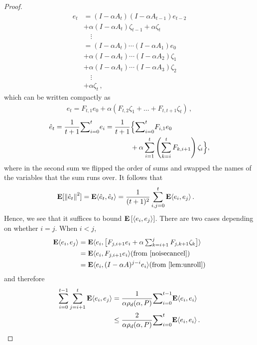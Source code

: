 \begin{proof}

\begin{align*}
e_t
& = (I-\alpha A_t) (I-\alpha A_{t-1}) e_{t-2}\\ &+ \alpha (I-\alpha A_t) \zeta_{t-1} +\alpha \zeta_t \\
& \quad \vdots\\
& = (I-\alpha A_t) \cdots (I-\alpha A_1) e_0\\ &+ \alpha (I-\alpha A_t) \cdots (I-\alpha A_2) \zeta_1 \\
& + \alpha (I-\alpha A_t) \cdots (I-\alpha A_3) \zeta_2\\
&  \quad \vdots \\
&+ \alpha \zeta_t\,,
\end{align*}
which can be written compactly as
\begin{align}
\label{eq:etft}
e_t = F_{t,1} e_0 + \alpha (F_{t,2} \zeta_1 + \dots + F_{t,t+1} \zeta_t )\,,
\end{align}
\begin{align*}
\hat{e}_t=\frac{1}{t+1}{\sum}_{i=0}^{t}e_i
=\frac{1}{t+1}&\Big\{{\sum}_{i=0}^{t} F_{i,1} e_0 \\
&+ \alpha \sum_{i=1}^{t} \left(\sum_{k=i}^{t} F_{k,i+1} \right)\zeta_i \Big\} ,
\end{align*}
where in the second sum we flipped the order of sums and swapped the names of the variables that the sum runs over.
It follows that 
\begin{align*}
\mathbf{E}[\left\| \hat{e}_t\right\|^2]&=\mathbf{E}\langle\hat{e}_t,\hat{e}_t\rangle
=\frac{1}{(t+1)^2} \sum_{i,j=0}^t \mathbf{E}\langle e_i,e_j\rangle\,.
\end{align*}
Hence, we see that it suffices to bound $\mathbf{E}\left[\langle e_i,  e_j \rangle\right]$.
There are two cases depending on whether $i=j$. When $i< j$,
\begin{align*}
\E\ip{e_i,e_j}
&=\E \ip{e_i,\big[F_{j,i+1} e_i+\alpha\textstyle\sum_{k=i+1}^j F_{j,k+1}\zeta_{k}\big]}\\
&=\E\ip{e_i,F_{j,i+1} e_i}  \text{(from \Cref{noisecancel})}\\
&=\E\ip{e_i, (I-\alpha A)^{j-i} e_i} \text{(from \Cref{lem:unroll})}
\end{align*}
and therefore
\begin{align*}
\label{inter}
\sum_{i=0}^{t-1}\sum_{j=i+1}^t \mathbf{E}\langle e_i,e_j\rangle
&=\frac1{\alpha\rho_d(\alpha,P)} {\sum}_{i=0}^{t-1}\mathbf{E}\langle e_i,e_i\rangle\\
&\leq \frac2{\alpha\rho_d(\alpha,P)}{\sum}_{i=0}^{t}\mathbf{E}\langle e_i,e_i\rangle\,.
\end{align*}

\end{proof}
